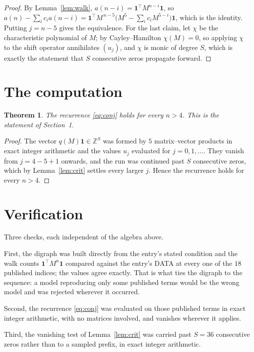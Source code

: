 \documentclass[11pt,a4paper]{article}
\theoremstyle{plain}
\newtheorem{theorem}{Theorem}
\theoremstyle{definition}
\begin{document}
\begin{proof}
By Lemma~\ref{lem:walk}, $a(n-i)=\mathbf{1}^{\!\top}M^{n-i}\mathbf{1}$, so
$a(n)-\sum_i c_i a(n-i)
=\mathbf{1}^{\!\top}M^{\,n-5}\bigl(M^{5}-\sum_i c_i M^{5-i}\bigr)
\mathbf{1}$, which is the identity. Putting $j=n-5$ gives the equivalence. For the
last claim, let $\chi$ be the characteristic polynomial of $M$; by Cayley--Hamilton
$\chi(M)=0$, so applying $\chi$ to the shift operator annihilates $(u_j)$, and $\chi$ is
monic of degree $S$, which is exactly the statement that $S$ consecutive zeros propagate
forward.
\end{proof}

\section{The computation}

\begin{theorem}
The recurrence \eqref{eq:conj} holds for every $n>4$. This is the statement of
Section~1.
\end{theorem}

\begin{proof}
The vector $q(M)\mathbf{1}\in\mathbb{Z}^{S}$ was formed by $5$ matrix--vector
products in exact integer arithmetic and the values $u_j$ evaluated for
$j=0,1,\dots$. They vanish from $j=4-5+1$ onwards, and the run was continued past
$S$ consecutive zeros, which by Lemma~\ref{lem:crit} settles every larger $j$. Hence the
recurrence holds for every $n>4$.
\end{proof}

\section{Verification}

Three checks, each independent of the algebra above.

First, the digraph was built directly from the entry's stated condition and the walk counts
$\mathbf{1}^{\!\top}M^{n}\mathbf{1}$ compared against the entry's DATA at every one of
the $18$ published indices; the values agree exactly. That is what ties the digraph to
the sequence: a model reproducing only some published terms would be the wrong model and
was rejected wherever it occurred.

Second, the recurrence \eqref{eq:conj} was evaluated on those published terms in exact
integer arithmetic, with no matrices involved, and vanishes wherever it applies.

Third, the vanishing test of Lemma~\ref{lem:crit} was carried past $S=36$ consecutive
zeros rather than to a sampled prefix, in exact integer arithmetic.
\end{document}
